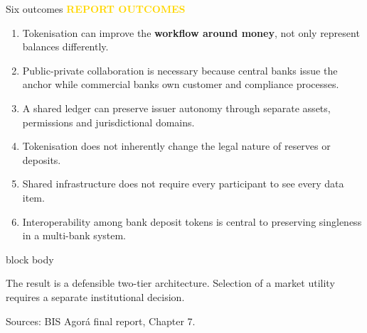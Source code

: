 \documentclass[aspectratio=169,12pt]{beamer}
\newcommand{\rust}[1]{\textcolor{Rust}{\textbf{#1}}}
\newcommand{\source}[1]{\vfill\par\fontsize{5.4}{6.5}\selectfont\color{Quiet}Sources: #1}
\newcommand{\tightitems}{\setlength{\itemsep}{0.42em}\setlength{\parskip}{0pt}}
\newcommand{\reporttag}[1]{\textcolor{Gold}{\fontsize{7.2}{8.5}\selectfont\bfseries REPORT #1}}
\newenvironment{statement}{%
  \begin{beamercolorbox}[sep=.18cm,rounded=false,wd=\linewidth]{block body}%
  \fontsize{13}{15.5}\selectfont\bfseries
}{\end{beamercolorbox}}
\begin{document}
\begin{frame}[shrink=30]{Six outcomes}
  \reporttag{OUTCOMES}\par\vspace{0.08cm}
  \begin{enumerate}\tightitems
    \item Tokenisation can improve the \rust{workflow around money}, not only represent balances differently.
    \item Public-private collaboration is necessary because central banks issue the anchor while commercial banks own customer and compliance processes.
    \item A shared ledger can preserve issuer autonomy through separate assets, permissions and jurisdictional domains.
    \item Tokenisation does not inherently change the legal nature of reserves or deposits.
    \item Shared infrastructure does not require every participant to see every data item.
    \item Interoperability among bank deposit tokens is central to preserving singleness in a multi-bank system.
  \end{enumerate}
  \begin{statement}
    The result is a defensible two-tier architecture. Selection of a market utility requires a separate institutional decision.
  \end{statement}
  \source{BIS Agor\'a final report, Chapter 7.}
\end{frame}
\end{document}
